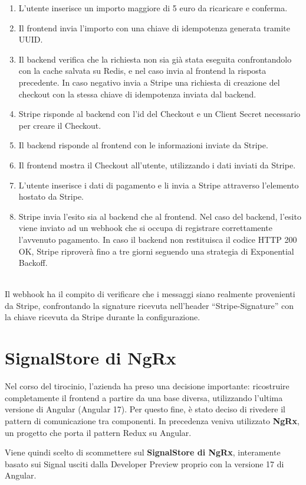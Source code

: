 \begin{enumerate}
  \item L'utente inserisce un importo maggiore di 5 euro da ricaricare e conferma.
  \item Il frontend invia l'importo con una chiave di idempotenza generata tramite UUID.
  \item Il backend verifica che la richiesta non sia gi\`a stata eseguita confrontandolo con la cache salvata su Redis, e nel caso invia al frontend la risposta precedente. In caso negativo invia a Stripe una richiesta di
    creazione del checkout con la stessa chiave di idempotenza inviata dal backend.
  \item Stripe risponde al backend con l'id del Checkout e un Client Secret necessario per creare il Checkout.
  \item Il backend risponde al frontend con le informazioni inviate da Stripe.
  \item Il frontend mostra il Checkout all'utente, utilizzando i dati inviati da Stripe.
  \item L'utente inserisce i dati di pagamento e li invia a Stripe attraverso l'elemento hostato da Stripe.
  \item Stripe invia l'esito sia al backend che al frontend. Nel caso del backend, l'esito viene inviato ad un webhook che si occupa di registrare correttamente l'avvenuto
    pagamento. In caso il backend non restituisca il codice HTTP 200 OK, Stripe riprover\`a fino a tre giorni seguendo una strategia di Exponential Backoff.
\end{enumerate}
\textbf{}\\
Il webhook ha il compito di verificare che i messaggi siano realmente provenienti da Stripe, confrontando la signature ricevuta nell'header ``Stripe-Signature'' con la
chiave ricevuta da Stripe durante la configurazione.

\section{SignalStore di NgRx}
Nel corso del tirocinio, l'azienda ha preso una decisione importante: ricostruire completamente il frontend a partire da una base diversa, utilizzando l'ultima
versione di Angular (Angular 17). Per questo fine, \`e stato deciso di rivedere il pattern di comunicazione tra componenti. In precedenza veniva utilizzato \textbf{NgRx}, un
progetto che porta il pattern Redux su Angular.

Viene quindi scelto di scommettere sul \textbf{SignalStore di NgRx}, interamente basato sui Signal usciti dalla Developer Preview proprio con la versione 17 di Angular.


